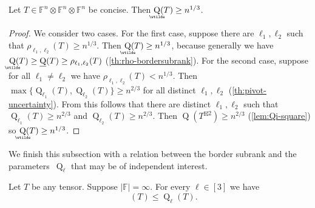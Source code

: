 \documentclass{daj}
\DeclareMathOperator{\subrank}{Q}
\DeclareMathOperator{\asympsubrank}{\underaccent{\wtilde}{Q}}
\DeclareMathOperator{\bordersubrank}{\underline{Q}}
\newcommand{\FF}{\mathbb{F}}
\begin{document}
%

%
%
%
%
%
%
%
%
%
%
%
%
%
%
%
%
%
%
%
%

\begin{theorem} \label{thm:cube-root-via-pivots}
Let $T \in \FF^n \otimes \FF^n \otimes \FF^n$ be concise. Then
$\asympsubrank(T) \geq n^{1/3}$.
\end{theorem}

%
%

\begin{proof}
We consider two cases.
For the first case, suppose there are ${\ell_1},{\ell_2}$ such that $\rho_{{\ell_1},{\ell_2}}(T) \geq n^{1/3}$. Then $\asympsubrank(T) \geq n^{1/3}$, because generally we have $\asympsubrank(T) \geq \bordersubrank(T) \geq \rho_{{\ell_1},{\ell_2}}(T)$ (\autoref{th:rho-bordersubrank}). 
For the second case, suppose for all ${\ell_1} \neq {\ell_2}$ we have $\rho_{{\ell_1},{\ell_2}}(T) < n^{1/3}$. Then $\max \{ \subrank_{\ell_1}(T), \subrank_{\ell_2}(T) \} \geq n^{2/3}$ for all distinct ${\ell_1},{\ell_2}$ (\autoref{th:pivot-uncertainty}). From this follows that there are distinct ${\ell_1},{\ell_2}$ such that $\subrank_{\ell_1}(T) \geq n^{2/3}$ and  $\subrank_{\ell_2}(T) \geq n^{2/3}$. Then $\subrank(T^{\boxtimes 2}) \geq n^{2/3}$ (\autoref{lem:Qi-square}) so $\asympsubrank(T) \geq n^{1/3}$.
\end{proof}


We finish this subsection with a relation between the border subrank and the parameters~$\subrank_\ell$ that may be of independent interest.


\begin{theorem} \label{thm:commrnk_bounds_bordersubrnk} 
Let $T$ be any tensor.
Suppose $|\FF|=\infty$. 
For every $\ell \in [3]$ we have
\[\bordersubrank(T) \leq \subrank_\ell(T).\]
\end{theorem}
\end{document}
